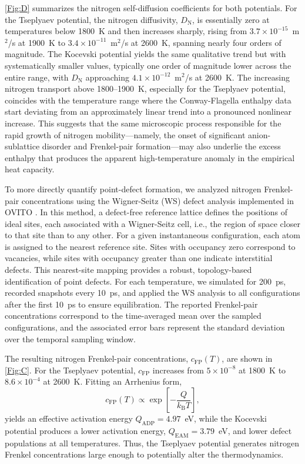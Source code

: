 \documentclass[
preprint, linenumbers,
amsmath, amssymb, aps, physrev,
]{revtex4-2}
\newcommand{\?}{\stackrel{?}{=}}
\begin{document}
\cref{Fig:D} summarizes the nitrogen self-diffusion coefficients for both potentials. For the Tseplyaev potential, the nitrogen diffusivity, $D_\text{N}$, is essentially zero at temperatures below 1800~K and then increases sharply, rising from $3.7\times10^{-15}$~m$^{2}$/s at 1900~K to $3.4\times10^{-11}$~m$^{2}$/s at 2600~K, spanning nearly four orders of magnitude. The Kocevski potential yields the same qualitative trend but with systematically smaller values, typically one order of magnitude lower across the entire range, with $D_\text{N}$ approaching $4.1 \times 10^{-12}$~m$^{2}$/s at 2600~K. The increasing nitrogen transport above 1800--1900~K, especially for the Tseplyaev potential, coincides with the temperature range where the Conway-Flagella enthalpy data start deviating from an approximately linear trend into a pronounced nonlinear increase. This suggests that the same microscopic process responsible for the rapid growth of nitrogen mobility---namely, the onset of significant anion-sublattice disorder and Frenkel-pair formation---may also underlie the excess enthalpy that produces the apparent high-temperature anomaly in the empirical heat capacity.

To more directly quantify point-defect formation, we analyzed nitrogen Frenkel-pair concentrations using the Wigner-Seitz (WS) defect analysis implemented in OVITO \cite{Stukowski2010}. In this method, a defect-free reference lattice defines the positions of ideal sites, each associated with a Wigner-Seitz cell, i.e., the region of space closer to that site than to any other. For a given instantaneous configuration, each atom is assigned to the nearest reference site. Sites with occupancy zero correspond to vacancies, while sites with occupancy greater than one indicate interstitial defects. This nearest-site mapping provides a robust, topology-based identification of point defects. For each temperature, we simulated for 200~ps, recorded snapshots every 10~ps, and applied the WS analysis to all configurations after the first 10~ps to ensure equilibration. The reported Frenkel-pair concentrations correspond to the time-averaged mean over the sampled configurations, and the associated error bars represent the standard deviation over the temporal sampling window.

The resulting nitrogen Frenkel-pair concentrations, $c_{\mathrm{FP}}(T)$, are shown in \cref{Fig:C}. For the Tseplyaev potential, $c_{\mathrm{FP}}$ increases from $5\times10^{-8}$ at 1800~K to $8.6\times10^{-4}$ at 2600~K. Fitting an Arrhenius form,
\begin{equation}
c_{\mathrm{FP}}(T) \propto \exp\!\left[-\frac{Q}{k_{\mathrm{B}}T}\right],
\end{equation}
yields an effective activation energy $Q_{\mathrm{ADP}} = 4.97$~eV, while the Kocevski potential produces a lower activation energy, $Q_{\mathrm{EAM}} = 3.79$~eV, and lower defect populations at all temperatures. Thus, the Tseplyaev potential generates nitrogen Frenkel concentrations large enough to potentially alter the thermodynamics.
\end{document}
